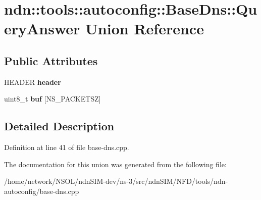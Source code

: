 \hypertarget{unionndn_1_1tools_1_1autoconfig_1_1BaseDns_1_1QueryAnswer}{}\section{ndn\+:\+:tools\+:\+:autoconfig\+:\+:Base\+Dns\+:\+:Query\+Answer Union Reference}
\label{unionndn_1_1tools_1_1autoconfig_1_1BaseDns_1_1QueryAnswer}
\subsection*{Public Attributes}
\begin{DoxyCompactItemize}
\item 
H\+E\+A\+D\+ER {\bfseries header}\hypertarget{unionndn_1_1tools_1_1autoconfig_1_1BaseDns_1_1QueryAnswer_a4aea5c13f7695192e68126d83705548d}{}\label{unionndn_1_1tools_1_1autoconfig_1_1BaseDns_1_1QueryAnswer_a4aea5c13f7695192e68126d83705548d}

\item 
uint8\+\_\+t {\bfseries buf} \mbox{[}N\+S\+\_\+\+P\+A\+C\+K\+E\+T\+SZ\mbox{]}\hypertarget{unionndn_1_1tools_1_1autoconfig_1_1BaseDns_1_1QueryAnswer_a27a1260ecc68b0d64995747d66798302}{}\label{unionndn_1_1tools_1_1autoconfig_1_1BaseDns_1_1QueryAnswer_a27a1260ecc68b0d64995747d66798302}

\end{DoxyCompactItemize}


\subsection{Detailed Description}


Definition at line 41 of file base-\/dns.\+cpp.



The documentation for this union was generated from the following file\+:\begin{DoxyCompactItemize}
\item 
/home/network/\+N\+S\+O\+L/ndn\+S\+I\+M-\/dev/ns-\/3/src/ndn\+S\+I\+M/\+N\+F\+D/tools/ndn-\/autoconfig/base-\/dns.\+cpp\end{DoxyCompactItemize}
